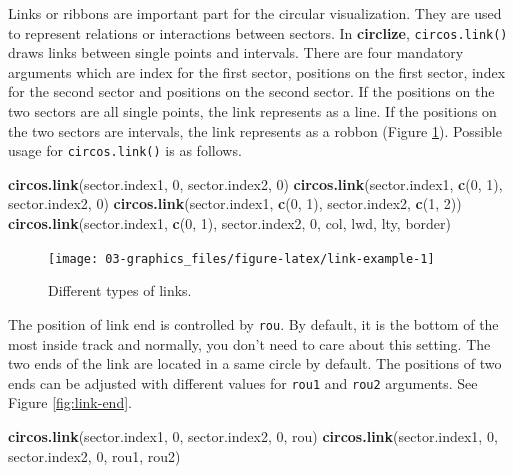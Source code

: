 \documentclass[]{book}
\newenvironment{Shaded}{\begin{snugshade}}{\end{snugshade}}
\newcommand{\KeywordTok}[1]{\textcolor[rgb]{0.13,0.29,0.53}{\textbf{#1}}}
\newcommand{\DecValTok}[1]{\textcolor[rgb]{0.00,0.00,0.81}{#1}}
\newcommand{\NormalTok}[1]{#1}
\begin{document}
Links or ribbons are important part for the circular visualization. They
are used to represent relations or interactions between sectors. In
\textbf{circlize}, \texttt{circos.link()} draws links between single
points and intervals. There are four mandatory arguments which are index
for the first sector, positions on the first sector, index for the
second sector and positions on the second sector. If the positions on
the two sectors are all single points, the link represents as a line. If
the positions on the two sectors are intervals, the link represents as a
robbon (Figure \ref{fig:link-example}). Possible usage for
\texttt{circos.link()} is as follows.

\begin{Shaded}
\begin{Highlighting}[]
\KeywordTok{circos.link}\NormalTok{(sector.index1, }\DecValTok{0}\NormalTok{, sector.index2, }\DecValTok{0}\NormalTok{)}
\KeywordTok{circos.link}\NormalTok{(sector.index1, }\KeywordTok{c}\NormalTok{(}\DecValTok{0}\NormalTok{, }\DecValTok{1}\NormalTok{), sector.index2, }\DecValTok{0}\NormalTok{)}
\KeywordTok{circos.link}\NormalTok{(sector.index1, }\KeywordTok{c}\NormalTok{(}\DecValTok{0}\NormalTok{, }\DecValTok{1}\NormalTok{), sector.index2, }\KeywordTok{c}\NormalTok{(}\DecValTok{1}\NormalTok{, }\DecValTok{2}\NormalTok{))}
\KeywordTok{circos.link}\NormalTok{(sector.index1, }\KeywordTok{c}\NormalTok{(}\DecValTok{0}\NormalTok{, }\DecValTok{1}\NormalTok{), sector.index2, }\DecValTok{0}\NormalTok{, col, lwd, lty, border)}
\end{Highlighting}
\end{Shaded}

\begin{figure}

{\centering \texttt{[image: 03-graphics\_files/figure-latex/link-example-1]} 

}

\caption{Different types of links.}\label{fig:link-example}
\end{figure}

The position of link end is controlled by \texttt{rou}. By default, it
is the bottom of the most inside track and normally, you don't need to
care about this setting. The two ends of the link are located in a same
circle by default. The positions of two ends can be adjusted with
different values for \texttt{rou1} and \texttt{rou2} arguments. See
Figure \ref{fig:link-end}.

\begin{Shaded}
\begin{Highlighting}[]
\KeywordTok{circos.link}\NormalTok{(sector.index1, }\DecValTok{0}\NormalTok{, sector.index2, }\DecValTok{0}\NormalTok{, rou)}
\KeywordTok{circos.link}\NormalTok{(sector.index1, }\DecValTok{0}\NormalTok{, sector.index2, }\DecValTok{0}\NormalTok{, rou1, rou2)}
\end{Highlighting}
\end{Shaded}
\end{document}
